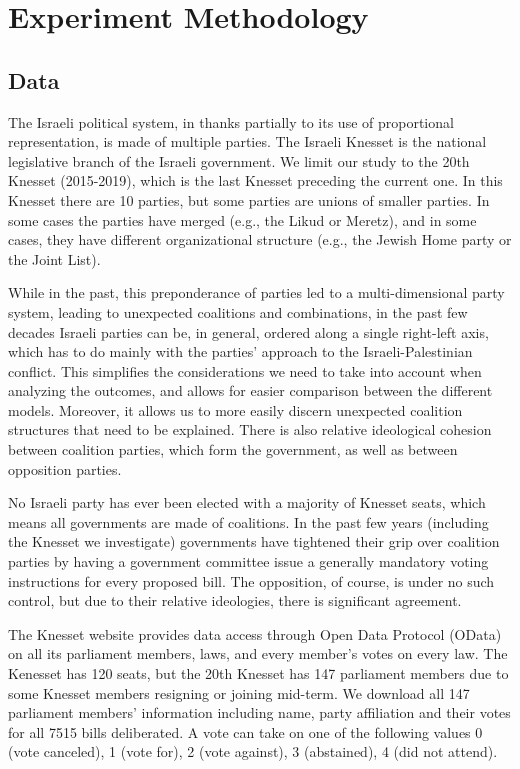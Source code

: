 
\chapter{Experiment Methodology}
\label{ch:experiment}
\vspace{2em}

\section{Data}
\label{sec:data}

The Israeli political system, in thanks partially to its use of
proportional representation, is made of multiple parties.
The Israeli Knesset is the national legislative branch of the Israeli government.
We limit our study to the 20th Knesset (2015-2019), which is the last
Knesset preceding the current one.
In this Knesset there are 10 parties, but some parties are unions of smaller parties.
In some cases the parties have merged (e.g., the Likud or Meretz),
and in some cases, they have different organizational structure
(e.g., the Jewish Home party or the Joint List).

While in the past, this preponderance of parties led to a multi-dimensional
party system, leading to unexpected coalitions and combinations,
in the past few decades Israeli parties can be, in general,
ordered along a single right-left axis, which has to do mainly with
the parties' approach to the Israeli-Palestinian conflict.
This simplifies the considerations we need to take into account when analyzing
the outcomes, and allows for easier comparison between the different models.
Moreover, it allows us to more easily discern
unexpected coalition structures that need to be explained.
There is also relative ideological cohesion between coalition parties, which
form the government, as well as between opposition parties.

No Israeli party has ever been elected with a majority of Knesset seats,
which means all governments are made of coalitions.
In the past few years (including the Knesset we investigate)
governments have tightened their grip over coalition parties
by having a government committee issue a generally mandatory
voting instructions for every proposed bill.
The opposition, of course, is under no such control,
but due to their relative ideologies, there is significant agreement.

The Knesset website provides data access through Open Data Protocol (OData)
on all its parliament members, laws, and every member's votes on every law.
The Kenesset has 120 seats, but the 20th Knesset has 147 parliament members
due to some Knesset members resigning or joining mid-term.
We download all 147 parliament members' information including name,
party affiliation and their votes for all 7515 bills deliberated.
A vote can take on one of the following values
0 (vote canceled), 1 (vote for), 2 (vote against),
3 (abstained), 4 (did not attend).

